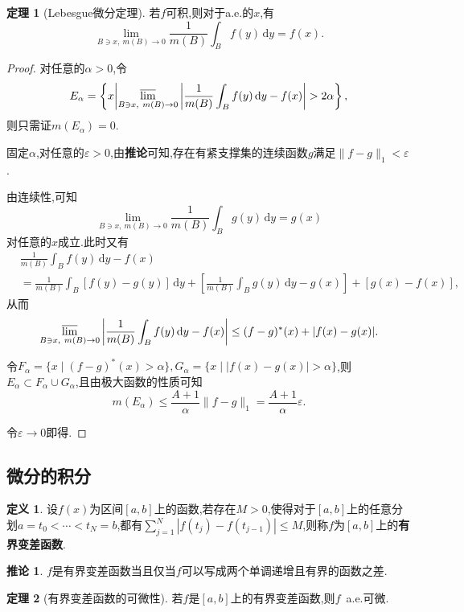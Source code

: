\documentclass{ctexart}
\theoremstyle{definition}
\newtheorem{definition}{定义}
\newtheorem{theorem}{定理}
\newtheorem{corollary}{推论}
\theoremstyle{remark}
\begin{document}
	\begin{theorem}[Lebesgue微分定理]
		若$f$可积,则对于a.e.的$x$,有
		$$\lim_{B\ni x,\ m(B)\to 0}{\frac{1}{m(B)}\int_B{f(y)\,\mathrm{d}y}}=f(x).$$
	\end{theorem}
	\begin{proof}
		对任意的$\alpha>0$,令
		$$E_\alpha=\left\{x\middle|\varlimsup_{B\ni x,\ m(B)\to 0}{\left|\frac{1}{m(B)}\int_B{f(y)\,\mathrm{d}y}-f(x)\right|}>2\alpha\right\},$$
		则只需证$m(E_\alpha)=0$.
		
		固定$\alpha$,对任意的$\varepsilon>0$,由\textbf{推论\label{cor_Lp_dense_set}}可知,存在有紧支撑集的连续函数$g$满足$\|f-g\|_1<\varepsilon$.
		
		由连续性,可知
		$$\lim_{B\ni x,\ m(B)\to 0}{\frac{1}{m(B)}\int_B{g(y)\,\mathrm{d}y}}=g(x)$$
		对任意的$x$成立.此时又有
		\begin{align*}
			& \frac{1}{m(B)}\int_B{f(y)\,\mathrm{d}y}-f(x) \\
			& = \frac{1}{m(B)}\int_B{[f(y)-g(y)]\,\mathrm{d}y}
			+ \left[\frac{1}{m(B)}\int_B{g(y)\,\mathrm{d}y}-g(x)\right]
			+ [g(x)-f(x)],
		\end{align*}
		从而
		$$\varlimsup_{B\ni x,\ m(B)\to 0}{\left|\frac{1}{m(B)}\int_B{f(y)\,\mathrm{d}y}-f(x)\right|}
		\le (f-g)^*(x) + |f(x)-g(x)|.$$
		
		令$F_\alpha=\{x\mid(f-g)^*(x)>\alpha\},G_\alpha=\{x\mid|f(x)-g(x)|>\alpha\}$,则$E_\alpha\subset F_\alpha\cup G_\alpha$,且由极大函数的性质可知
		$$m(E_\alpha)\le\frac{A+1}{\alpha}\|f-g\|_1=\frac{A+1}{\alpha}\varepsilon.$$
		
		令$\varepsilon\to 0$即得.
	\end{proof}
	
	\subsection{微分的积分}
	
	\begin{definition}
		设$f(x)$为区间$[a,b]$上的函数,若存在$M>0$,使得对于$[a,b]$上的任意分划$a=t_0<\cdots<t_N=b$,都有$\sum_{j=1}^N{|f(t_j)-f(t_{j-1})|}\le M$,则称$f$为$[a,b]$上的\textbf{有界变差函数}.
	\end{definition}
	\begin{corollary}
		$f$是有界变差函数当且仅当$f$可以写成两个单调递增且有界的函数之差.
	\end{corollary}
	\begin{theorem}[有界变差函数的可微性]
		若$f$是$[a,b]$上的有界变差函数,则$f$\ a.e.可微.
	\end{theorem}
	
\end{document}
